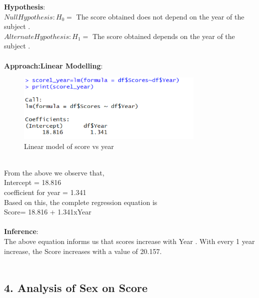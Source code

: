 \documentclass[12pt,epsf]{report}
\begin{document}
\textbf{Hypothesis}:\\
$Null Hypothesis : H_0 = $ The score obtained does not depend on the year of the subject .\\
$Alternate Hypothesis : H_1 = $ The score obtained depends on the year of the subject .\\
\\
\textbf{Approach:Linear Modelling}:\\
\begin{figure}[!ht]
	\centering
	\includegraphics[width=0.8\textwidth]{Picture3}
	\caption{Linear model of score vs year}
	\centering
\end{figure}
\\
From the above we observe that,\\
Intercept = 18.816 \\
coefficient for year = 1.341 \\
Based on this, the complete regression equation is \\
Score= 18.816 + 1.341xYear\\
\\
\textbf{Inference}:\\
The above equation informs us that scores increase with Year . With every 1 year increase, the Score increases with a value of 20.157.\\
\\
\subsection*{4. Analysis of Sex on Score}
\end{document}
